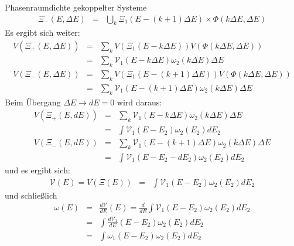 \begin{chapter}{\titlestr}
\begin{appendix}
\begin{section}{Phasenraumdichte gekoppelter Systeme}
\begin{eqnarray*}
\Xi_-(E,\Delta E) &=& \bigcup_k \Xi_1(E-(k+1)\Delta E)\times \Phi(k\Delta E,\Delta E)
\end{eqnarray*}
Es ergibt sich weiter:
\begin{eqnarray*}
V(\Xi_+(E,\Delta E)) &=& \sum_k V(\Xi_1(E-k\Delta E))V(\Phi(k\Delta E,\Delta E))\\
&=& \sum_k \mathcal{V}_1(E-k\Delta E)\omega_2(k\Delta E)\Delta E\\
V(\Xi_-(E,\Delta E)) &=& \sum_k V(\Xi_1(E-(k+1)\Delta E))V(\Phi(k\Delta E,\Delta E))\\
&=& \sum_k \mathcal{V}_1(E-(k+1)\Delta E)\omega_2(k\Delta E)\Delta E
\end{eqnarray*}
Beim Übergang $\Delta E\rightarrow dE=0$ wird daraus:
\begin{eqnarray*}
V(\Xi_+(E,d E)) &=&\sum_k \mathcal{V}_1(E-k\Delta E)\omega_2(k\Delta E)\Delta E\\
&=& \int \mathcal{V}_1(E-E_2)\omega_2(E_2)dE_2\\
V(\Xi_-(E,d E)) &=&\sum_k \mathcal{V}_1(E-(k+1)\Delta E)\omega_2(k\Delta E)\Delta E\\
&=& \int \mathcal{V}_1(E-E_2-dE_2)\omega_2(E_2)dE_2
\end{eqnarray*}
und es ergibt sich:
\begin{eqnarray*}
\mathcal{V}(E) = V(\Xi(E)) &=& \int \mathcal{V}_1(E-E_2)\omega_2(E_2)dE_2
\end{eqnarray*}
und schließlich
\begin{eqnarray*}
\omega(E) &=& \frac{d\mathcal{V}}{dE}(E) = \frac{d}{dE}\int \mathcal{V}_1(E-E_2)\omega_2(E_2)dE_2\\
&=& \int \frac{d\mathcal{V}_1}{dE}(E-E_2)\omega_2(E_2)dE_2\\
&=& \int \omega_1(E-E_2)\omega_2(E_2)dE_2
\end{eqnarray*}

\end{section}


\end{appendix}
\end{chapter}
